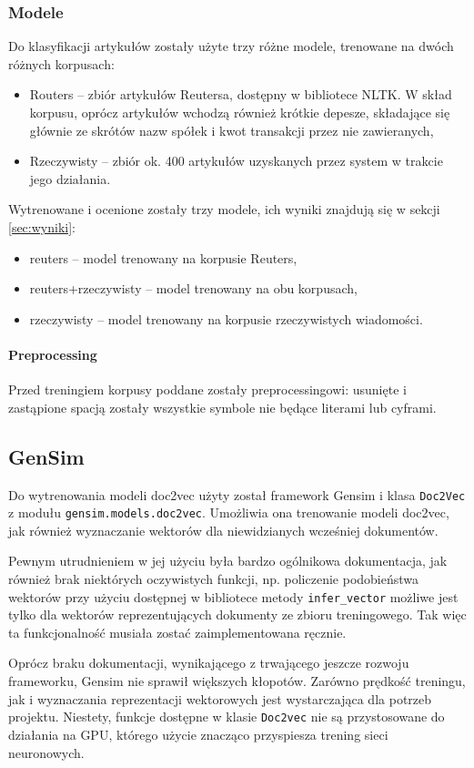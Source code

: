 \subsubsection{Modele}
\label{ssec:modele}

Do klasyfikacji artykułów zostały użyte trzy różne modele, trenowane
na dwóch różnych korpusach:

\begin{itemize}
\item Routers -- zbiór artykułów Reutersa, dostępny w bibliotece
  NLTK. W skład korpusu, oprócz artykułów wchodzą również krótkie
  depesze, składające się głównie ze skrótów nazw spółek i kwot
  transakcji przez nie zawieranych,
\item Rzeczywisty -- zbiór ok. 400 artykułów uzyskanych przez system w
  trakcie jego działania.
\end{itemize}

Wytrenowane i ocenione zostały trzy modele, ich wyniki znajdują się w sekcji \ref{sec:wyniki}:

\begin{itemize}
\item reuters -- model trenowany na korpusie Reuters,
\item reuters+rzeczywisty -- model trenowany na obu korpusach,
\item rzeczywisty -- model trenowany na korpusie rzeczywistych wiadomości.
\end{itemize}

\paragraph{Preprocessing}

Przed treningiem korpusy poddane zostały preprocessingowi: usunięte i
zastąpione spacją zostały wszystkie symbole nie będące literami lub
cyframi.


\subsection{GenSim}

Do wytrenowania modeli doc2vec użyty został framework Gensim i klasa
\texttt{Doc2Vec} z modułu \texttt{gensim.models.doc2vec}. Umożliwia
ona trenowanie modeli doc2vec, jak również wyznaczanie wektorów dla
niewidzianych wcześniej dokumentów.

Pewnym utrudnieniem w jej użyciu była bardzo ogólnikowa dokumentacja,
jak również brak niektórych oczywistych funkcji, np. policzenie
podobieństwa wektorów przy użyciu dostępnej w bibliotece metody
\texttt{infer\_vector} możliwe jest tylko dla wektorów reprezentujących
dokumenty ze zbioru treningowego. Tak więc ta funkcjonalność musiała
zostać zaimplementowana ręcznie.

Oprócz braku dokumentacji, wynikającego z trwającego jeszcze rozwoju
frameworku, Gensim nie sprawił większych kłopotów. Zarówno prędkość
treningu, jak i wyznaczania reprezentacji wektorowych jest
wystarczająca dla potrzeb projektu. Niestety, funkcje dostępne w
klasie \texttt{Doc2vec} nie są przystosowane do działania na GPU,
którego użycie znacząco przyspiesza trening sieci neuronowych.

